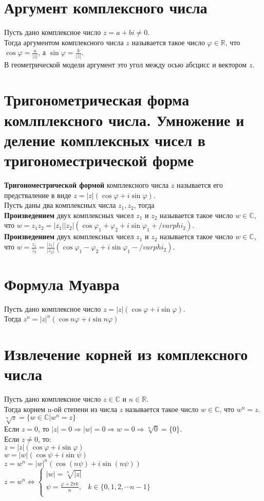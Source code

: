 \documentclass[a4paper,11pt]{report}
\begin{document}
\section{Аргумент комплексного числа}
Пусть дано комплексное число $z = a + bi \neq 0$.\\
Тогда аргументом комплексного числа $z$ называется такое число $\varphi \in \mathbb{R}$, что
$\cos{\varphi} = \frac{a}{|z|}$, а $\sin{\varphi} = \frac{b}{|z|}$.\\
В геометрической модели аргумент это угол между осью абсцисс и вектором $z$.
\section{Тригонометрическая форма комлплексного числа. Умножение и деление комплексных чисел в тригономестрической
	      форме}
\textbf{Тригономестрической формой} комплексного числа $z$ называется его предстваление в виде 
$z = |z|(\cos{\varphi} + i\sin{\varphi})$.\\
Пусть даны два комплексных числа $z_1, z_2$, тогда\\
\textbf{Произведением} двух комплексных чисел $z_1$ и $z_2$ называется такое число $w \in \mathbb{C}$, что
$w = z_1z_2 = |z_1||z_2|(\cos{\varphi_1 + \varphi_2} + i\sin{\varphi_1 + /varphi_2})$.\\
\textbf{Произведением} двух комплексных чисел $z_1$ и $z_2$ называется такое число $w \in \mathbb{C}$, что
$w = \frac{z_1}{z_2} = \frac{|z_1|}{|z_2|}(\cos{\varphi_1 - \varphi_2} + i\sin{\varphi_1 - /varphi_2})$.\\
\section{Формула Муавра}
Пусть дано комплексное число $z = |z|(\cos{\varphi} + i\sin{\varphi})$.\\
Тогда $z^n = |z|^n(\cos{n\varphi} + i\sin{n\varphi})$
\section{Извлечение корней из комплексного числа}
Пусть дано комплексное число $z \in \mathbb{C}$ и $n \in \mathbb{R}$.\\
Тогда корнем n-ой степени из числа $z$ называется такое число $w \in \mathbb{C}$, что $w^n = z$.\\
$\sqrt[n]{z} = \{w \in \mathbb{C} | w^n = z\}$\\
Если $z = 0$, то $|z| = 0 \Rightarrow |w| = 0 \Rightarrow w = 0 \Rightarrow \sqrt[n]{0} = \{0\}$.\\
Если $z \neq 0$, то:\\
$z = |z|(\cos{\varphi} + i\sin{\varphi})$\\
$w = |w|(\cos{\psi} + i\sin{\psi})$\\
$z = w^n = |w|^n(\cos{(n\psi)} + i\sin{(n\psi)})$\\
$z = w^n \Leftrightarrow 
\begin{cases}
|w| = \sqrt[n]{|z|}\\
\psi = \frac{\varphi + 2\pi{k}}{n}, & k \in \{0, 1, 2, \cdots n - 1\}\\
\end{cases}
$
\end{document}
